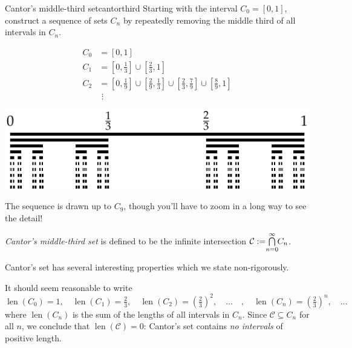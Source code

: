 \begin{example}{Cantor's middle-third set}{cantorthird}
	Starting with the interval $C_0=[0,1]$, construct a sequence of sets $C_n$ by repeatedly removing the middle third of all intervals in $C_n$.\par
	
	\begin{minipage}[t]{0.45\linewidth}\vspace{-15pt}
		\begin{align*}
			C_0&=[0,1]\\
			C_1&=[0,\tfrac 13]\cup [\tfrac 23,1]\\
			C_2&=[0,\tfrac 19]\cup [\tfrac 29,\tfrac 13]\cup [\tfrac 23,\tfrac 79]\cup [\tfrac 89,1]\\
			&\mathrel{\,\,\vdots}
		\end{align*}
	\end{minipage}
	\hfill
	\begin{minipage}[t]{0.54\linewidth}\vspace{-10pt}
		\hfill \href{http://www.math.uci.edu/~ndonalds/math13/cantoranim.html}{\includegraphics{setsii-02-cantor}}
	\end{minipage}
	\par

	The sequence is drawn up to $C_9$, though you'll have to zoom in a long way to see the detail!\par

	\emph{Cantor's middle-third set} is defined to be the infinite intersection $\mathcal C:=\negthickspace\bigcap\limits_{n=0}^\infty\negthickspace C_n$.\par

	Cantor's set has several interesting properties which we state non-rigorously.
	\begin{description}\itemsep2pt
		\item[Zero Measure (length)] It should seem reasonable to write
		\[
			\operatorname{len}(C_0)=1,\quad \operatorname{len}(C_1)=\tfrac 23,\quad\operatorname{len}(C_2)=\left(\tfrac 23\right)^2,\quad \ldots\quad ,\quad \operatorname{len}(C_n)=\left(\tfrac 23\right)^n,\quad\ldots
		\]
		where $\operatorname{len}(C_n)$ is the sum of the lengths of all intervals in $C_n$. Since $\mathcal C\subseteq C_n$ for all $n$, we conclude that $\operatorname{len}(\mathcal C)=0$: Cantor's set contains \emph{no intervals} of positive length.
	

\end{description}
\end{example}
